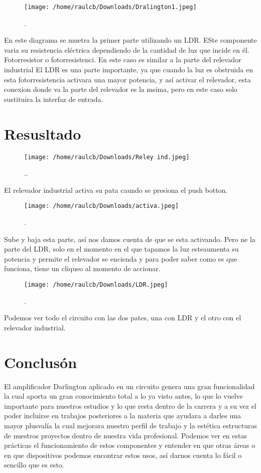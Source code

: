 \documentclass[11pt]{article}
\begin{document}
\begin{figure}[htp]
\centering
\texttt{[image: /home/raulcb/Downloads/Dralington1.jpeg]}
\caption{.}
\label{.}
\end{figure}

En este diagrama se muetra la primer parte utilizando un LDR. ESte componente varia su resistencia eléctrica dependiendo de la cantidad de luz que incide en él. Fotorresistor o fotorresistenci.  
En este caso es similar a la parte del relevador industrial
El LDR es una parte importante, ya que cuando la luz es obstruida en esta fotorresistencia activara una mayor potencia, y así activar el relevador, esta conexion donde va la parte del relevador es la msima, pero en este caso solo sustituira la interfaz de entrada. 

\section{Resusltado}
\begin{figure}[htp]
\centering
\texttt{[image: /home/raulcb/Downloads/Reley ind.jpeg]}
\caption{..}
\label{..}
\end{figure}
El relevador industrial activa su pata caundo se presiona el push botton.
\begin{figure}[htp]
\centering
\texttt{[image: /home/raulcb/Downloads/activa.jpeg]}
\caption{.}
\label{.}
\end{figure}
Sube y baja esta parte, así nos damos cuenta de que se esta activando. Pero ne la parte del LDR, solo en el momento en el que tapamos la luz esteaumenta su potencia y permite el relevador se encienda y para poder saber como es que funciona, tiene un cliqueo al momento de accionar.
\begin{figure}[htp]
\centering
\texttt{[image: /home/raulcb/Downloads/LDR.jpeg]}
\caption{.}
\label{.}
\end{figure}
Podemos ver todo el circuito con las dos pates, una con LDR y el otro con el relevador industrial.
\section{Conclusón}
El amplificador Darlington aplicado en un circuito genera una gran funcionalidad la cual aporta un gran conocimiento total a lo ya visto antes, lo que lo vuelve importante para nuestros estudios y lo que resta dentro de la carrera y a su vez el poder incluirse en trabajos posteriores a la materia que  ayudara a darles una mayor plusvalía la cual mejorara nuestro perfil de trabajo y la estética estructuras de nuestros proyectos dentro de nuestra vida profesional.
 Podemos ver en estas prácticas el funcionamiento de estos componentes y entender en que otras áreas o en que dispositivos podemos encontrar estos usos, así darnos cuenta lo fácil o sencillo que es esto.
\end{document}
